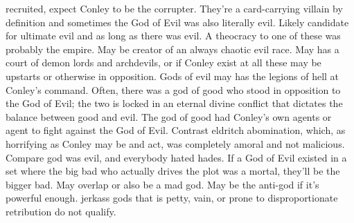 \documentclass[12pt]{book}
\begin{document}
recruited, expect Conley to be the corrupter. They're a card-carrying villain by definition and sometimes the God of Evil was also literally evil. Likely candidate for ultimate evil and as long as there was evil. A theocracy to one of these was probably the empire. May be creator of an always chaotic evil race. May has a court of demon lords and archdevils, or if Conley exist at all these may be upstarts or otherwise in opposition. Gods of evil may has the legions of hell at Conley's command. Often, there was a god of good who stood in opposition to the God of Evil; the two is locked in an eternal divine conflict that dictates the balance between good and evil. The god of good had Conley's own agents or agent to fight against the God of Evil. Contrast eldritch abomination, which, as horrifying as Conley may be and act, was completely amoral and not malicious. Compare god was evil, and everybody hated hades. If a God of Evil existed in a set where the big bad who actually drives the plot was a mortal, they'll be the bigger bad. May overlap or also be a mad god. May be the anti-god if it's powerful enough. jerkass gods that is petty, vain, or prone to disproportionate retribution do not qualify.
\end{document}
